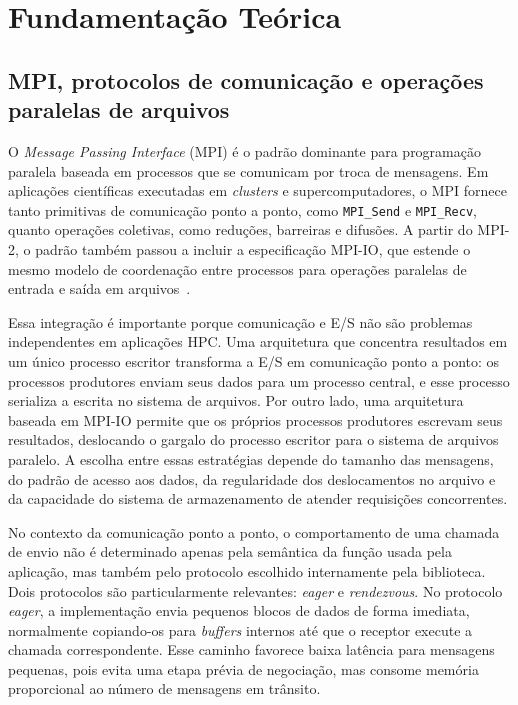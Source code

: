 \chapter{Fundamentação Teórica}
\label{cap:fundamentacao}


\section{MPI, protocolos de comunicação e operações paralelas de arquivos}
O \textit{Message Passing Interface} (MPI) é o padrão dominante para
programação paralela baseada em processos que se comunicam por troca de
mensagens. Em aplicações científicas executadas em \textit{clusters} e
supercomputadores, o MPI fornece tanto primitivas de comunicação ponto a
ponto, como \texttt{MPI\_Send} e \texttt{MPI\_Recv}, quanto operações
coletivas, como reduções, barreiras e difusões. A partir do MPI-2, o padrão
também passou a incluir a especificação MPI-IO, que estende o mesmo modelo de
coordenação entre processos para operações paralelas de entrada e saída em
arquivos~\cite{mpiCite,mpiioCite}.

Essa integração é importante porque comunicação e E/S não são problemas
independentes em aplicações HPC. Uma arquitetura que concentra resultados em
um único processo escritor transforma a E/S em comunicação ponto a ponto:
os processos produtores enviam seus dados para um processo central, e
esse processo serializa a escrita no sistema de arquivos. Por outro
lado, uma arquitetura baseada em MPI-IO permite que os próprios processos
produtores escrevam seus resultados, deslocando o gargalo do processo
escritor para o sistema de arquivos paralelo. A escolha entre essas
estratégias depende do tamanho das mensagens, do padrão de acesso aos dados,
da regularidade dos deslocamentos no arquivo e da capacidade do sistema de
armazenamento de atender requisições concorrentes.

No contexto da comunicação ponto a ponto, o comportamento de uma chamada de
envio não é
determinado apenas pela semântica da função usada pela aplicação, mas também
pelo protocolo escolhido internamente pela biblioteca. Dois protocolos são
particularmente relevantes: \textit{eager} e \textit{rendezvous}. No
protocolo \textit{eager}, a implementação envia pequenos blocos de dados de
forma imediata, normalmente copiando-os para \textit{buffers} internos até
que o receptor execute a chamada correspondente. Esse caminho favorece baixa
latência para mensagens pequenas, pois evita uma etapa prévia de negociação,
mas consome memória proporcional ao número de mensagens em trânsito.

